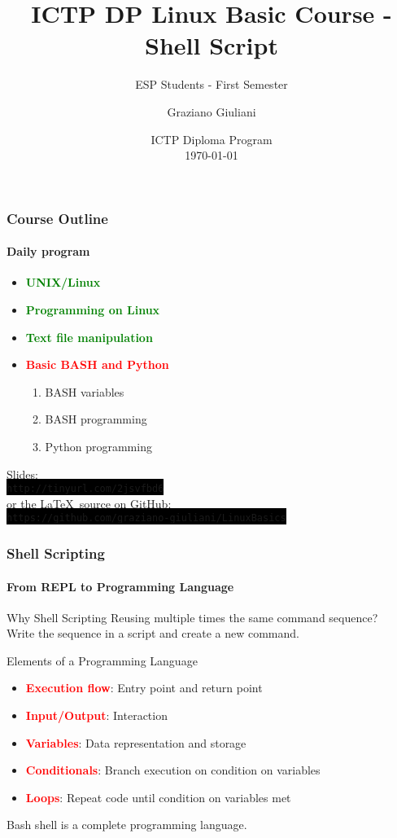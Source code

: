 \documentclass[unknownkeysallowed, 10pt, a4 paper, handout]{beamer}
\title[Linux Programming]{ICTP DP Linux Basic Course - Shell Script}
\subtitle{ESP Students - First Semester}
\author[Graziano Giuliani]{Graziano Giuliani \\ \focus{ggiulian@ictp.it}}
\institute[ICTP]{The Abdus Salam International Centre for Theoretical Physics}
\date[\today]{ICTP Diploma Program \\ \today}
\newcommand{\focus}[1]{\textbf{\textcolor{red}{#1}}}
\newcommand{\expire}[1]{\textbf{\textcolor{green}{#1}}}
\newcommand{\code}[1]{\colorbox{black}{\color{green}\texttt{#1}}}
\begin{document}
\begin{frame}
  \titlepage
\end{frame}


\begin{frame}[label=outline]
  \frametitle{Course Outline \footnotemark}
  \framesubtitle{Daily program}
  \begin{itemize}
    \item \expire{UNIX/Linux}
    \item \expire{Programming on Linux}
    \item \expire{Text file manipulation}
    \item \focus{Basic BASH and Python}
      \begin{enumerate}
        \item BASH variables
        \item BASH programming
        \item Python programming
      \end{enumerate}
  \end{itemize}

  \vspace{6mm}

  Slides: \\ \code{http://tinyurl.com/2jsvfbd6}
  \vspace{4mm} \\
  or the \LaTeX \ source on GitHub: \\
  \code{https://github.com/graziano-giuliani/LinuxBasics}


\end{frame}


\begin{frame}
  \frametitle{Shell Scripting}
  \framesubtitle{From REPL to Programming Language}

  \begin{alertblock}{Why Shell Scripting}
    Reusing multiple times the same command sequence? \\
      Write the sequence in a script and create a new command.
  \end{alertblock}
  \begin{block}{Elements of a Programming Language}
    \begin{itemize}
      \item \focus{Execution flow}: Entry point and return point
      \item \focus{Input/Output}: Interaction
      \item \focus{Variables}: Data representation and storage
      \item \focus{Conditionals}: Branch execution on condition on variables
      \item \focus{Loops}: Repeat code until condition on variables met
    \end{itemize}
  \end{block}
  \begin{exampleblock}{}
    Bash shell is a complete programming language.
  \end{exampleblock}
\end{frame}
\end{document}
